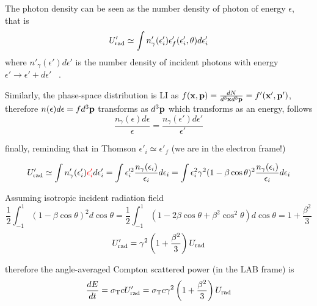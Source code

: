 The photon density can be seen as the number density of photon of energy $\epsilon$, that is
%
\begin{equation*}
U'_{\rm rad} \simeq 
\int n'_\gamma(\epsilon'_i) \epsilon'_f(\epsilon'_i, \theta) d\epsilon'_i
\end{equation*}
%
where $n'_\gamma(\epsilon') d\epsilon'$ is the number density of incident photons with energy $\epsilon' \rightarrow \epsilon' + d\epsilon'$ \, .


Similarly, the phase-space distribution is LI as $f (\vb x, \vb p) = \frac{dN}{d^3\vb x d^3 \vb p} = f'(\vb x', \vb p')$, therefore $n(\epsilon) d\epsilon = f d^3 \vb p$ transforms as $d^3 \vb p$ which transforms as an energy, follows
%
\begin{equation*}
\frac{n_\gamma(\epsilon) d\epsilon}{\epsilon} = \frac{n_\gamma(\epsilon') d\epsilon'}{\epsilon'}
\end{equation*}

finally, reminding that in Thomson $\epsilon'_i \simeq \epsilon'_f$ (we are in the electron frame!)

\begin{equation*}
U'_{\rm rad} 
\simeq \int n^\prime_\gamma(\epsilon^\prime_i) {\color{red}\epsilon^\prime_i}  d\epsilon^\prime_i 
= \int \epsilon_i^{\prime 2} \frac{n_\gamma(\epsilon_i)}{\epsilon_i} d\epsilon_i 
= \int \epsilon_i^2 \gamma^2 (1-\beta\cos\theta)^2 \frac{n_\gamma(\epsilon_i)}{\epsilon_i} d\epsilon_i 
\end{equation*}

Assuming isotropic incident radiation field
%
\begin{equation*}
\frac{1}{2} \int_{-1}^{1} (1-\beta \cos \theta)^2 d\cos\theta = \frac{1}{2} \int_{-1}^{1} (1-2\beta\cos\theta + \beta^2\cos^2\theta) d\cos\theta = 1 + \frac{\beta^2}{3}
\end{equation*}
%
\begin{equation*}
U'_{\rm rad} = \gamma^2 \left(1 + \frac{\beta^2}{3}\right) U_{\rm rad}
\end{equation*}

therefore the angle-averaged Compton scattered power (in the LAB frame) is
%
\begin{equation*}
\frac{dE}{dt} = \sigma_{\rm T} c U'_{\rm rad} = \sigma_{\rm T} c \gamma^2 \left( 1 + \frac{\beta^2}{3} \right) U_{\rm rad} 
\end{equation*}

